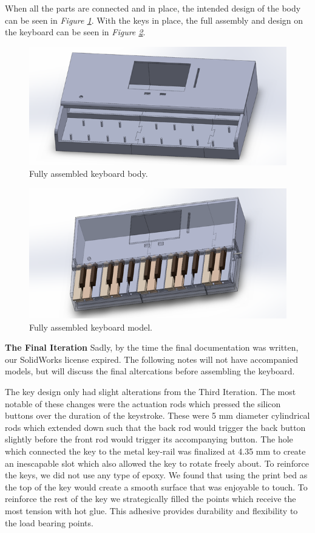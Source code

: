 When all the parts are connected and in place, the intended design of the body can be seen in \textit{Figure \ref{fig:final_model1}}. With the keys in place, the full assembly and design on the keyboard can be seen in \textit{Figure \ref{fig:final_model2}}.

\begin{figure}[h!]
  \centering
  \includegraphics[width=0.8\linewidth]{image/FinalModel1.png}
  \caption{Fully assembled keyboard body.}
  \label{fig:final_model1}
\end{figure}

\begin{figure}[h!]
  \centering
  \includegraphics[width=0.8\linewidth]{image/FinalModel2.png}
  \caption{Fully assembled keyboard model.}
  \label{fig:final_model2}
\end{figure}
\clearpage

\textbf{The Final Iteration}
Sadly, by the time the final documentation was written, our SolidWorks license expired. The following notes will not have accompanied models, but will discuss the final altercations before assembling the keyboard.

The key design only had slight alterations from the Third Iteration. The most notable of these changes were the actuation rods which pressed the silicon buttons over the duration of the keystroke. These were 5 mm diameter cylindrical rods which extended down such that the back rod would trigger the back button slightly before the front rod would trigger its accompanying button. The hole which connected the key to the metal key-rail was finalized at 4.35 mm to create an inescapable slot which also allowed the key to rotate freely about. To reinforce the keys, we did not use any type of epoxy. We found that using the print bed as the top of the key would create a smooth surface that was enjoyable to touch. To reinforce the rest of the key we strategically filled the points which receive the most tension with hot glue. This adhesive provides durability and flexibility to the load bearing points.

